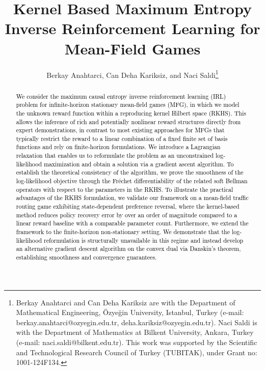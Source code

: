 \documentclass[11pt]{article}
\newcommand{\tb}[1]{\textcolor{black}{#1}} %
\begin{document}
\title{Kernel Based Maximum Entropy Inverse Reinforcement Learning for Mean-Field Games}
\date{}
\author{Berkay Anahtarci, Can Deha Kariksiz, and Naci Saldi\thanks{Berkay Anahtarci and Can Deha Kariksiz are with the Department of Mathematical Engineering, \"{O}zye\u{g}in University, {I}stanbul, Turkey (e-mail: berkay.anahtarci@ozyegin.edu.tr, deha.kariksiz@ozyegin.edu.tr). Naci Saldi is with the Department of Mathematics at Bilkent University, Ankara, Turkey (e-mail: naci.saldi@bilkent.edu.tr). This work was supported by the Scientific and Technological Research Council of Turkey (TUBITAK), under Grant no: 1001-124F134.}}\maketitle 

\begin{abstract}
\tb{We consider the maximum causal entropy inverse reinforcement learning (IRL) problem for infinite-horizon stationary mean-field games (MFG), in which we model the unknown reward function within a reproducing kernel Hilbert space (RKHS). This allows the inference of rich and potentially nonlinear reward structures directly from expert demonstrations, in contrast to most existing approaches for MFGs that typically restrict the reward to a linear combination of a fixed finite set of basis functions and rely on finite-horizon formulations. We introduce a Lagrangian relaxation that enables us to reformulate the problem as an unconstrained log-likelihood maximization and obtain a solution via a gradient ascent algorithm. To establish the theoretical consistency of the algorithm, we prove the smoothness of the log-likelihood objective through the Fr\'echet differentiability of the related soft Bellman operators with respect to the parameters in the RKHS. To illustrate the practical advantages of the RKHS formulation, we validate our framework on a mean-field traffic routing game exhibiting state-dependent preference reversal, where the kernel-based method reduces policy recovery error by over an order of magnitude compared to a linear reward baseline with a comparable parameter count. Furthermore, we extend the framework to the finite-horizon non-stationary setting. We demonstrate that the log-likelihood reformulation is structurally unavailable in this regime and instead develop an alternative gradient descent algorithm on the convex dual via Danskin's theorem, establishing smoothness and convergence guarantees.}






\end{abstract}
\end{document}
